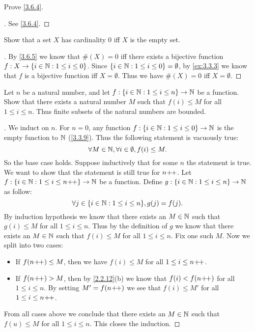 \exercisesection

\begin{ex}\label{ex:3.6.1}
	Prove \cref{3.6.4}.
\end{ex}

\begin{proof}[]
	See \cref{3.6.4}.
\end{proof}

\begin{ex}\label{ex:3.6.2}
	Show that a set \(X\) has cardinality \(0\) iff \(X\) is the empty set.
\end{ex}

\begin{proof}[]
	By \cref{3.6.5} we know that \(\#(X) = 0\) iff there exists a bijective function \(f : X \to \left\lbrace i \in \mathbb{N} : 1 \leq i \leq 0\right\rbrace\).
	Since \(\left\lbrace i \in \mathbb{N} : 1 \leq i \leq 0\right\rbrace = \emptyset\), by \cref{ex:3.3.3} we know that \(f\) is a bijective function iff \(X = \emptyset\).
	Thus we have \(\#(X) = 0\) iff \(X = \emptyset\).
\end{proof}

\begin{ex}\label{ex:3.6.3}
	Let \(n\) be a natural number, and let \(f : \left\lbrace i \in \mathbb{N} : 1 \leq i \leq n\right\rbrace \to \mathbb{N}\) be a function.
	Show that there exists a natural number \(M\) such that \(f(i) \leq M\) for all \(1 \leq i \leq n\).
	Thus finite subsets of the natural numbers are bounded.
\end{ex}

\begin{proof}[]
	We induct on \(n\).
	For \(n = 0\), any function \(f : \left\lbrace i \in \mathbb{N} : 1 \leq i \leq 0\right\rbrace \to \mathbb{N}\) is the empty function to \(\mathbb{N}\) (\cref{3.3.9}).
	Thus the following statement is vacuously true:
	\[
		\forall M \in \mathbb{N}, \forall i \in \emptyset, f(i) \leq M.
	\]
	So the base case holds.
	Suppose inductively that for some \(n\) the statement is true.
	We want to show that the statement is still true for \(n\!+\!\!+\).
	Let \(f : \left\lbrace i \in \mathbb{N} : 1 \leq i \leq n\!+\!\!+\right\rbrace \to \mathbb{N}\) be a function.
	Define \(g : \left\lbrace i \in \mathbb{N} : 1 \leq i \leq n\right\rbrace \to \mathbb{N}\) as follow:
	\[
		\forall j \in \set{i \in \N : 1 \leq i \leq n}, g(j) = f(j).
	\]
	By induction hypothesis we know that there exists an \(M \in \mathbb{N}\) such that \(g(i) \leq M\) for all \(1 \leq i \leq n\).
	Thus by the definition of \(g\) we know that there exists an \(M \in \mathbb{N}\) such that \(f(i) \leq M\) for all \(1 \leq i \leq n\).
	Fix one such \(M\).
	Now we split into two cases:
	\begin{itemize}
		\item If \(f(n\!+\!\!+) \leq M\), then we have \(f(i) \leq M\) for all \(1 \leq i \leq n\!+\!\!+\).
		\item If \(f(n\!+\!\!+) > M\), then by \cref{2.2.12}(b) we know that \(f(i) < f(n\!+\!\!+)\) for all \(1 \leq i \leq n\).
		      By setting \(M' = f(n\!+\!\!+)\) we see that \(f(i) \leq M'\) for all \(1 \leq i \leq n\!+\!\!+\).
	\end{itemize}
	From all cases above we conclude that there exists an \(M \in \mathbb{N}\) such that \(f(u) \leq M\) for all \(1 \leq i \leq n\).
	This closes the induction.
\end{proof}

